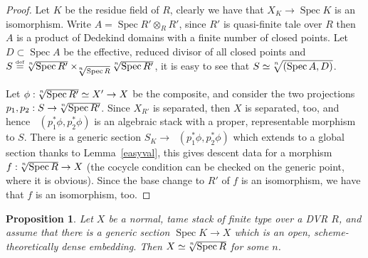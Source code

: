 \documentclass{amsart}
\numberwithin{equation}{section}
\numberwithin{subsection}{section}
\newtheorem{proposition}[theorem]{Proposition}
\theoremstyle{definition}
\theoremstyle{remark}
\newcommand{\eqdef}{\mathrel{\smash{\overset{\mathrm{\scriptscriptstyle def}} =}}}
\newcommand\spec{\operatorname{Spec}}
\newcommand{\underisom}{\mathop{\underline{\mathrm{Isom}}}\nolimits}
\newcommand\radice[2][\relax]{\hspace{-1.5pt}\sqrt[\uproot{2}#1]{#2}}
\begin{document}
\begin{proof}
	Let $K$ be the residue field of $R$, clearly we have that $X_{K}\to\spec K$ is an isomorphism. Write $A=\spec R'\otimes_{R}R'$, since $R'$ is quasi-finite tale over $R$ then $A$ is a product of Dedekind domains with a finite number of closed points. Let $D\subset \spec A$ be the effective, reduced divisor of all closed points and $S\eqdef \radice[n]{\spec R'}\times_{\radice[n]{\spec R}}\radice[n]{\spec R'}$, it is easy to see that $S\simeq\radice[n]{(\spec A,D)}$.
	
	Let $\phi:\radice[n]{\spec R'}\simeq X'\to X$ be the composite, and consider the two projections $p_{1},p_{2}:S\to\radice[n]{\spec R'}$. Since $X_{R'}$ is separated, then $X$ is separated, too, and hence $\underisom(p_{1}^{*}\phi,p_{2}^{*}\phi)$ is an algebraic stack with a proper, representable morphism to $S$. There is a generic section $S_{K}\to \underisom(p_{1}^{*}\phi,p_{2}^{*}\phi)$ which extends to a global section thanks to Lemma~\ref{easyval}, this gives descent data for a morphism $f:\radice[n]{\spec R}\to X$ (the cocycle condition can be checked on the generic point, where it is obvious). Since the base change to $R'$ of $f$ is an isomorphism, we have that $f$ is an isomorphism, too.
\end{proof}

\begin{proposition}\label{tameroot}
	Let $X$ be a normal, tame stack of finite type over a DVR $R$, and assume that there is a generic section $\spec K\to X$ which is an open, scheme-theoretically dense embedding. Then $X\simeq\radice[n]{\spec R}$ for some $n$.
\end{proposition}
\end{document}
